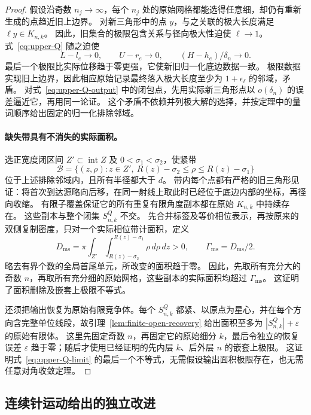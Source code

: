 \begin{proof}
假设沿奇数 $n_j\to\infty$，每个 $n_j$ 处的原始网格都能选得任意细，却仍有重新生成的点趋近旧上边界。
对新三角形中的点 $y$，与之关联的极大长度满足 $\ell y\in K_{n,k}$。
因此，旧集合的极限包含关系与径向极大性迫使 $\ell\to1$。
式~\eqref{eq:upper-Q} 随之迫使
\[
 L-l_e\to0,\qquad U-r_e\to0,\qquad
                  (H-h_e)/\delta_n\to0.
\]
最后一个极限比实际位移趋于零更强，它使新旧归一化底边数据一致。
极限数据实现旧上边界，因此相应原始记录最终落入极大长度至少为 $1+\epsilon_\ell$ 的邻域，矛盾。
对式~\eqref{eq:upper-Q-output} 中的闭包点，先用实际新三角形点以 $o(\delta_n)$ 的误差逼近它，再用同一论证。
这个矛盾不依赖并列极大解的选择，并按定理中的量词顺序给出固定的归一化排除邻域。

\paragraph{缺失带具有不消失的实际面积。}
选正宽度闭区间 $Z'\subset\operatorname{int}Z$ 及 $0<\sigma_1<\sigma_2$，使紧带
\[
 \mathcal B=\{(z,\rho):z\in Z',\ R(z)-\sigma_2\le\rho\le R(z)-\sigma_1\}
\]
位于上述排除邻域内，且所有半径都大于 $d$。
带内每个点都有严格的旧三角形见证：将首次到达源略向后移，在同一射线上取此时已经位于底边内部的坐标，再径向收缩。
有限子覆盖保证它的所有重复有限角度副本都在原始 $K_{n,k}$ 中持续存在。
这些副本与整个闭集 $S^Q_{n,k}$ 不交。
先合并标签及等价相位表示，再按原来的双侧复制密度，只对一个实际相位带计面积，定义
\begin{equation}\label{eq:upper-gamma-definition}
 D_{\mathrm{ms}}=\pi\int_{Z'}\int_{R(z)-\sigma_2}^{R(z)-\sigma_1}
                    \rho\,d\rho\,dz>0,
 \qquad \Gamma_{\mathrm{ms}}=D_{\mathrm{ms}}/2.
\end{equation}
略去有界个数的全局首尾单元，所改变的面积趋于零。
因此，先取所有充分大的奇数 $n$，再取所有充分细的原始网格，这些副本的实际面积均超过 $\Gamma_{\mathrm{ms}}$。
这证明了面积删除及嵌套上极限不等式。

还须把输出恢复为原始有限竞争体。每个 $S^Q_{n,k}$ 都紧、以原点为星心，并在每个方向含完整单位线段，故引理~\ref{lem:finite-open-recovery} 给出面积至多为 $|S^Q_{n,k}|+\varepsilon$ 的原始有限体。
这里先固定奇数 $n$，再固定它的原始细分 $k$，最后令独立的恢复误差 $\varepsilon$ 趋于零；随后才使用已经证明的先内层 $k$、后外层 $n$ 的嵌套上极限。
这证明式~\eqref{eq:upper-Q-limit} 的最后一个不等式，无需假设输出面积极限存在，也无需任意对角收敛定理。
\end{proof}

\subsection{连续针运动给出的独立改进}
\label{subsec:upper-coherent}

